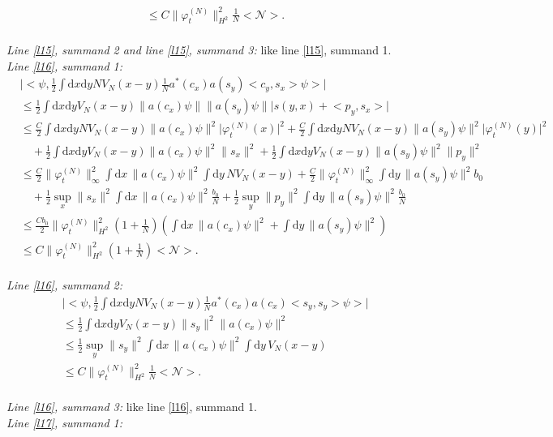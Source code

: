 \documentclass[11pt,a4paper,DIV11]{scrartcl}	%
\newcommand{\di}{\textrm{d}}		%
\newcommand{\Ncal}{\mathcal{N}}		%
\newcommand{\estlist}[2]{\emph{\vspace{.3em}\\Line \ref{l#1}, summand #2:}}
\newcommand{\nestlist}[2]{line \ref{l#1}, summand #2}
\newcommand{\Nestlist}[2]{Line \ref{l#1}, summand #2}
\newcommand{\scal}[2]{\big<#1,#2\big>} %
\newcommand{\norm}[1]{\lVert#1\rVert}	%
\newcommand{\ev}[1]{\big<#1\big>}	%
\newcommand{\ph}{\varphi_t^{(N)}}	%
\newcommand{\dxyNV}{\frac{1}{2}\int \di x\di y N V_N(x-y)} %
\newcommand{\dxyV}{\frac{1}{2}\int \di x\di y V_N(x-y)} %
\begin{document}
\begin{fleqn}[0.5em]
\begin{align*}
& \leq C \norm{\ph}_{H^2}^2 \frac{1}{N}\ev{\Ncal}. 
\end{align*}
\emph{\vspace{.3em}\\\Nestlist{15}{2} and \nestlist{15}{3}:} like \nestlist{15}{1}.\newline
\estlist{16}{1}
\begin{align*}
& \lvert \scal{\psi}{\dxyNV \frac{1}{N}a^\ast(c_x) a(s_y) \scal{c_y}{s_x}\psi} \rvert \\
& \leq \dxyV \norm{a(c_x)\psi} \norm{a(s_y)\psi} \lvert s(y,x)+\scal{p_y}{s_x} \rvert \\
& \leq \frac{C}{2}\int \di x\di y N V_N(x-y) \norm{a(c_x)\psi}^2 \lvert \ph(x)\rvert^2 + \frac{C}{2}\int \di x\di y N V_N(x-y) \norm{a(s_y)\psi}^2 \lvert \ph(y)\rvert^2\\
& \quad + \dxyV \norm{a(c_x)\psi}^2 \norm{s_x}^2 + \dxyV \norm{a(s_y)\psi}^2 \norm{p_y}^2 \\
& \leq \frac{C}{2} \norm{\ph}_\infty^2 \int \di x\, \norm{a(c_x)\psi}^2 \int \di y\, NV_N(x-y) + \frac{C}{2} \norm{\ph}_\infty^2 \int \di y\, \norm{a(s_y)\psi}^2 b_0 \\
& \quad + \frac{1}{2}\sup_x\norm{s_x}^2 \int \di x\, \norm{a(c_x)\psi}^2 \frac{b_0}{N} + \frac{1}{2} \sup_y \norm{p_y}^2 \int \di y\, \norm{a(s_y)\psi}^2 \frac{b_0}{N} \\
& \leq \frac{C b_0}{2} \norm{\ph}_{H^2}^2 \left(1+\frac{1}{N}\right) \left( \int \di x\,\norm{a(c_x)\psi}^2 + \int \di y\,\norm{a(s_y)\psi}^2 \right) \\
& \leq C\norm{\ph}_{H^2}^2 \left(1+\frac{1}{N}\right)\ev{\Ncal}.
\end{align*}
\estlist{16}{2}
\begin{align*}
& \lvert \scal{\psi}{\dxyNV \frac{1}{N} a^\ast(c_x) a(c_x)\scal{s_y}{s_y}\psi} \rvert \\
& \leq \dxyV \norm{s_y}^2 \norm{a(c_x)\psi}^2 \\
& \leq \frac{1}{2} \sup_y \norm{s_y}^2 \int \di x\, \norm{a(c_x)\psi}^2 \int \di y\, V_N(x-y) \\
& \leq C\norm{\ph}_{H^2}^2 \frac{1}{N}\ev{\Ncal}.
\end{align*}
\emph{\vspace{.3em}\\\Nestlist{16}{3}:} like \nestlist{16}{1}.\newline
\estlist{17}{1}
\begin{align*}

\end{align*}
\end{fleqn}
\end{document}

